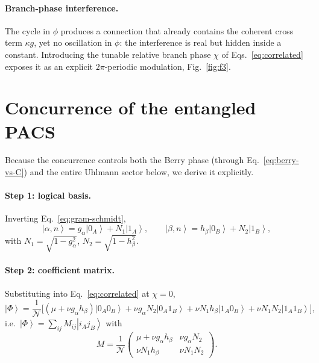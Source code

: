 \documentclass[11pt]{article}
\newcommand{\ket}[1]{\left|#1\right\rangle}
\begin{document}
\paragraph{Branch-phase interference.}
The cycle in $\phi$ produces a connection that already contains the coherent
cross term $\kappa g$, yet no oscillation in $\phi$: the interference is real
but hidden inside a constant. Introducing the tunable relative branch phase
$\chi$ of Eqs.~\eqref{eq:correlated} exposes it as an explicit
$2\pi$-periodic modulation, Fig.~\ref{fig:f3}.

\section{Concurrence of the entangled PACS}
\label{sec:concurrence}

Because the concurrence controls both the Berry phase (through
Eq.~\eqref{eq:berry-vs-C}) and the entire Uhlmann sector below, we derive it
explicitly.

\paragraph{Step 1: logical basis.} Inverting Eq.~\eqref{eq:gram-schmidt},
\begin{equation}
\ket{\alpha,n}=g_\alpha\ket{0_A}+N_1\ket{1_A},\qquad
\ket{\beta,n}=h_\beta\ket{0_B}+N_2\ket{1_B},
\end{equation}
with $N_1=\sqrt{1-g_\alpha^2}$, $N_2=\sqrt{1-h_\beta^2}$.

\paragraph{Step 2: coefficient matrix.} Substituting into
Eq.~\eqref{eq:correlated} at $\chi=0$,
\begin{equation}
\ket{\Phi}=\frac{1}{\mathcal N}\Big[(\mu+\nu g_\alpha h_\beta)\ket{0_A0_B}
+\nu g_\alpha N_2\ket{0_A1_B}+\nu N_1h_\beta\ket{1_A0_B}
+\nu N_1N_2\ket{1_A1_B}\Big],
\end{equation}
i.e.\ $\ket{\Phi}=\sum_{ij}M_{ij}\ket{i_Aj_B}$ with
\begin{equation}
M=\frac{1}{\mathcal N}
\begin{pmatrix}\mu+\nu g_\alpha h_\beta & \nu g_\alpha N_2\\[2pt]
\nu N_1h_\beta & \nu N_1N_2\end{pmatrix}.
\end{equation}
\end{document}
